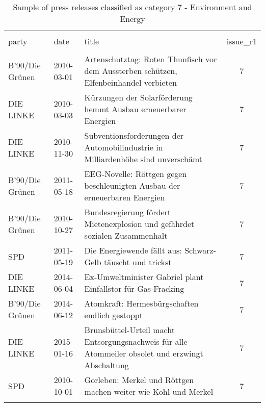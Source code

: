 
\begin{table}[!htbp] \centering 
  \caption{Sample of press releases classified as category 7 - Environment and Energy} 
  \label{tab:7-document-samples} 
\begin{tabularx}{\textwidth}{stXc} 
\\[-1.8ex]\hline 
\hline \\[-1.8ex] 
party & date & title & issue\_r1 \\ 
\hline \\[-1.8ex] 
B'90/Die Grünen & 2010-03-01 & Artenschutztag: Roten Thunfisch vor dem Aussterben schützen, Elfenbeinhandel verbieten & 7 \\ 
DIE LINKE & 2010-03-03 & Kürzungen der Solarförderung hemmt Ausbau erneuerbarer Energien & 7 \\ 
DIE LINKE & 2010-11-30 & Subventionsforderungen der Automobilindustrie in Milliardenhöhe sind unverschämt & 7 \\ 
B'90/Die Grünen & 2011-05-18 & EEG-Novelle: Röttgen gegen beschleunigten Ausbau der erneuerbaren Energien & 7 \\ 
B'90/Die Grünen & 2010-10-27 & Bundesregierung fördert Mietenexplosion und gefährdet sozialen Zusammenhalt & 7 \\ 
SPD & 2011-05-19 & Die Energiewende fällt aus: Schwarz-Gelb täuscht und trickst & 7 \\ 
DIE LINKE & 2014-06-04 & Ex-Umweltminister Gabriel plant Einfallstor für Gas-Fracking & 7 \\ 
B'90/Die Grünen & 2014-06-12 & Atomkraft: Hermesbürgschaften endlich gestoppt & 7 \\ 
DIE LINKE & 2015-01-16 & Brunsbüttel-Urteil macht Entsorgungsnachweis für alle Atommeiler obsolet und erzwingt Abschaltung & 7 \\ 
SPD & 2010-10-01 & Gorleben: Merkel und Röttgen machen weiter wie Kohl und Merkel & 7 \\ 
\hline \\[-1.8ex] 
\end{tabularx} 
\end{table} 
